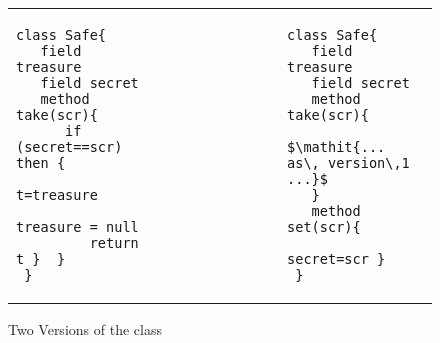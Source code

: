  \begin{figure}[htb]
 \begin{tabular}{lll} %
\begin{minipage}{0.45\textwidth}
\begin{lstlisting}
class Safe{
   field treasure 
   field secret 
   method take(scr){
      if (secret==scr) then {
         t=treasure
         treasure = null
         return t }  }
 }
\end{lstlisting}
\end{minipage}
  &\ \ \  \ \ \ \ \  \ \ \ \ \ \ &
\begin{minipage}{0.45\textwidth}
\begin{lstlisting}
class Safe{
   field treasure   
   field secret  
   method take(scr){
       $\mathit{... as\, version\,1 ...}$ 
   }
   method set(scr){
         secret=scr }
 }
\end{lstlisting}
\end{minipage} 
 \end{tabular}
  \vspace*{-0.95cm}
  \caption{Two Versions of the class }
 \label{fig:ExampleSafe}
 \vspace*{-0.65cm}
 \end{figure}
 

